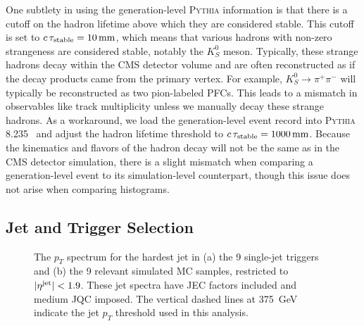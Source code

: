 \documentclass[aps,prd,twocolumn,preprintnumbers,nofootinbib,longbibliography,floatfix,superscriptaddress]{revtex4-1}
\begin{document}
One subtlety in using the generation-level \textsc{Pythia} information is that there is a cutoff on the hadron lifetime above which they are considered stable.
%
This cutoff is set to $c \, \tau_{\rm stable} = \SI{10}{mm}$, which means that various hadrons with non-zero strangeness are considered stable, notably the $K_S^0$ meson.
%
Typically, these strange hadrons decay within the CMS detector volume and are often reconstructed as if the decay products came from the primary vertex.
%
For example, $K_S^0 \to \pi^+ \pi^-$ will typically be reconstructed as two pion-labeled PFCs.
%
This leads to a mismatch in observables like track multiplicity unless we manually decay these strange hadrons.
%
As a workaround, we load the generation-level event record into \textsc{Pythia} 8.235~\cite{Sjostrand:2014zea} and adjust the hadron lifetime threshold to $c \, \tau_{\rm stable} = \SI{1000}{mm}$.
%
Because the kinematics and flavors of the hadron decay will not be the same as in the CMS detector simulation, there is a slight mismatch when comparing a generation-level event to its simulation-level counterpart, though this issue does not arise when comparing histograms.


\subsection{Jet and Trigger Selection}
\label{subsec:selection}


\begin{figure*}[p]
  \centering
  \caption{
  The $p_T$ spectrum for the hardest jet in (a) the 9 single-jet triggers and (b) the 9 relevant simulated MC samples, restricted to $|\eta^{\rm jet}| < 1.9$.
  These jet spectra have JEC factors included and medium JQC imposed.
  The vertical dashed lines at \SI{375}{GeV} indicate the jet $p_T$ threshold used in this analysis.
 }
     \label{figures:raw_pt_spectrum}
\end{figure*}
\end{document}
